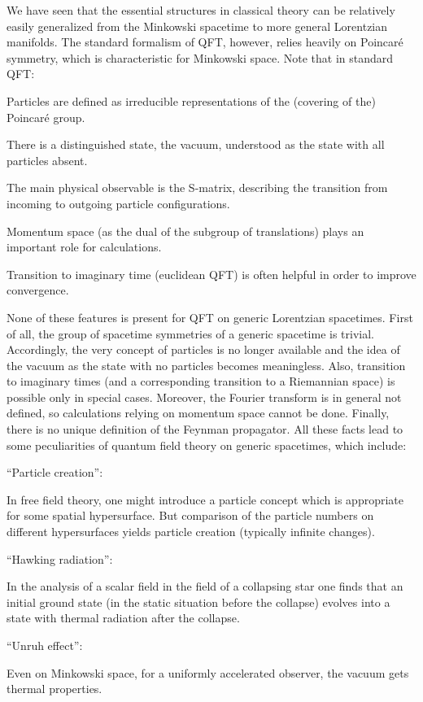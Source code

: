 \documentclass[12pt]{article}
\newcommand{\1}{\mathds{1}}                         %
\begin{document}
We have seen that the essential structures in classical theory can be relatively easily generalized from the Minkowski spacetime to more general Lorentzian manifolds. The standard formalism of QFT, however, relies heavily on Poincar\'{e} symmetry, which is characteristic for Minkowski space. Note that in standard QFT:
\begin{itemize}

{\item Particles are defined as irreducible representations of the (covering of the) Poincar\'{e} group.}

{\item There is a distinguished state, the vacuum, understood as the state with all particles absent.}

{\item The main physical observable is the S-matrix, describing the transition from incoming to outgoing particle configurations.}

{\item  Momentum space (as the dual of the subgroup of translations) plays an important role for calculations.}

{\item Transition to imaginary time (euclidean QFT) is often helpful in order to improve convergence. }
\end{itemize}



None of these features is present for QFT on generic Lorentzian spacetimes. First of all, the group of spacetime symmetries of a generic spacetime is trivial. Accordingly, the very concept of particles is no longer available and the idea of the vacuum as the state with no particles becomes meaningless. Also,  transition to imaginary times (and a corresponding transition to a Riemannian space) is possible only in special cases. Moreover, the Fourier transform is in general not defined, so calculations relying on momentum space cannot be done. Finally, there is no unique definition of the Feynman propagator. All these facts lead to  some peculiarities of quantum field theory on generic spacetimes, which include:
\begin{itemize}

{\item ``Particle creation'':} 

{In free field theory, one might introduce a particle concept which is appropriate for some spatial hypersurface.} 
{But comparison of the particle numbers on different hypersurfaces yields particle creation
(typically infinite changes).}

{\item ``Hawking radiation'':} 

{In the analysis of a scalar field in the field of a collapsing star one finds that an initial ground state (in the static situation before the collapse) evolves into a state with thermal radiation after the collapse.}

{\item ``Unruh effect'': }

{Even on Minkowski space, for a uniformly accelerated observer, the vacuum gets thermal properties.}
\end{itemize}
\end{document}

